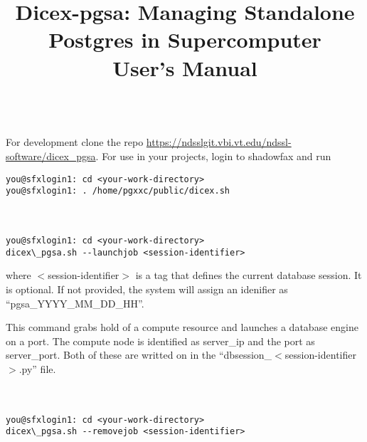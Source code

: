 \documentclass[10,twocolumn]{article}
\begin{document}
\title{Dicex-pgsa: Managing Standalone Postgres in Supercomputer\\ 
User's Manual}

\maketitle

\paragraph{}\hfill\\
For development clone the repo \url{https://ndsslgit.vbi.vt.edu/ndssl-software/dicex_pgsa}.
For use in your projects, login to shadowfax and run
\begin{lstlisting}[style=mystyle]
you@sfxlogin1: cd <your-work-directory>
you@sfxlogin1: . /home/pgxxc/public/dicex.sh
\end{lstlisting}

\paragraph{}\hfill\\
\begin{lstlisting}[style=mystyle]
you@sfxlogin1: cd <your-work-directory>
dicex\_pgsa.sh --launchjob <session-identifier>
\end{lstlisting}
where $<$session-identifier$>$ is a tag that defines the current database session.  It is optional. 
If not provided, the system will assign an idenifier as ``pgsa\_YYYY\_MM\_DD\_HH''. 

This command grabs hold of a compute resource and launches a database engine on a port. 
The compute node is identified as server\_ip and the port as server\_port. Both of these
are writted on in the ``dbsession\_$<$session-identifier$>$.py'' file. 

\paragraph{}\hfill\\
\begin{lstlisting}[style=mystyle]
you@sfxlogin1: cd <your-work-directory>
dicex\_pgsa.sh --removejob <session-identifier>
\end{lstlisting}
\end{document}
